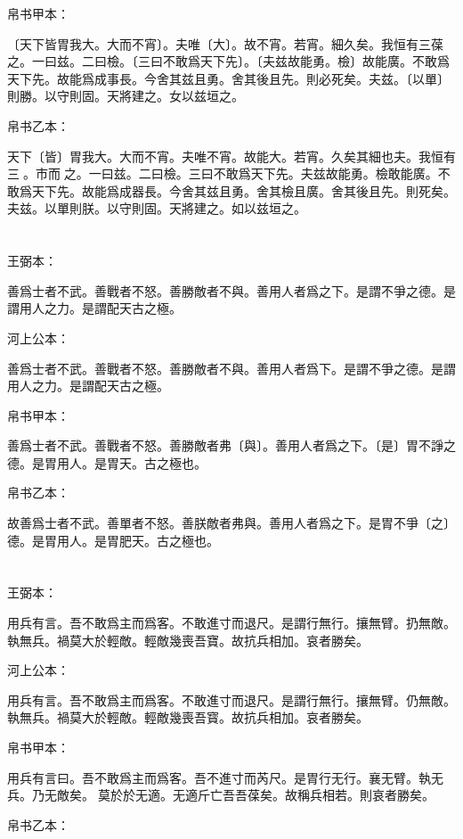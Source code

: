 \documentclass[a5paper]{ctexbook}
\begin{document}
    帛书甲本：

    〔天下皆胃我大。大而不宵〕。夫唯〔大〕。故不宵。若宵。細久矣。我恒有三葆之。一曰兹。二曰檢。〔三曰不敢爲天下先〕。〔夫兹故能勇。檢〕故能廣。不敢爲天下先。故能爲成事長。今舍其兹且勇。舍其後且先。則必死矣。夫兹。〔以單〕則勝。以守則固。天將建之。女以兹垣之。

    帛书乙本：

    天下〔皆〕胃我大。大而不宵。夫唯不宵。故能大。若宵。久矣其細也夫。我恒有三𤥯。市而𤥯之。一曰兹。二曰檢。三曰不敢爲天下先。夫兹故能勇。檢敢能廣。不敢爲天下先。故能爲成器長。今舍其兹且勇。舍其檢且廣。舍其後且先。則死矣。夫兹。以單則朕。以守則固。天將建之。如以兹垣之。

    \chapter{}
    王弼本：

    善爲士者不武。善戰者不怒。善勝敵者不與。善用人者爲之下。是謂不爭之德。是謂用人之力。是謂配天古之極。

    河上公本：

    善爲士者不武。善戰者不怒。善勝敵者不與。善用人者爲下。是謂不爭之德。是謂用人之力。是謂配天古之極。

    帛书甲本：

    善爲士者不武。善戰者不怒。善勝敵者弗〔與〕。善用人者爲之下。〔是〕胃不諍之德。是胃用人。是胃天。古之極也。

    帛书乙本：

    故善爲士者不武。善單者不怒。善朕敵者弗與。善用人者爲之下。是胃不爭〔之〕德。是胃用人。是胃肥天。古之極也。

    \chapter{}
    王弼本：

    用兵有言。吾不敢爲主而爲客。不敢進寸而退尺。是謂行無行。攘無臂。扔無敵。執無兵。禍莫大於輕敵。輕敵幾喪吾寶。故抗兵相加。哀者勝矣。

    河上公本：

    用兵有言。吾不敢爲主而爲客。不敢進寸而退尺。是謂行無行。攘無臂。仍無敵。執無兵。禍莫大於輕敵。輕敵幾喪吾寳。故抗兵相加。哀者勝矣。

    帛书甲本：

    用兵有言曰。吾不敢爲主而爲客。吾不進寸而芮尺。是胃行无行。襄无臂。執无兵。乃无敵矣。𢢸莫於於无適。无適斤亡吾吾葆矣。故稱兵相若。則哀者勝矣。

    帛书乙本：
\end{document}
